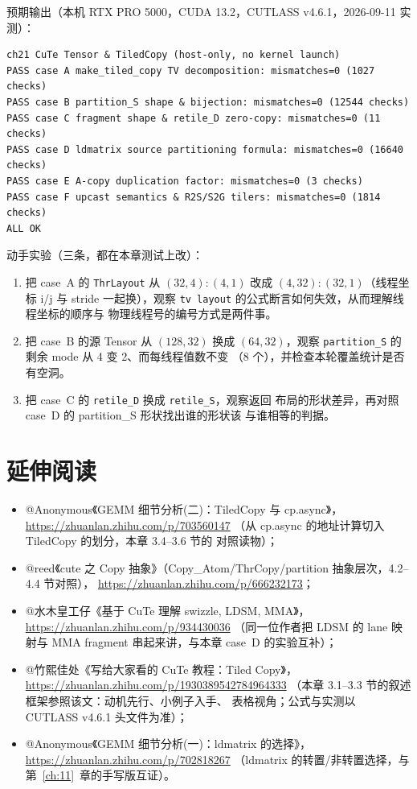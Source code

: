 预期输出（本机 RTX PRO 5000，CUDA 13.2，CUTLASS v4.6.1，2026-09-11 实测）：

\begin{lstlisting}[style=console]
ch21 CuTe Tensor & TiledCopy (host-only, no kernel launch)
PASS case A make_tiled_copy TV decomposition: mismatches=0 (1027 checks)
PASS case B partition_S shape & bijection: mismatches=0 (12544 checks)
PASS case C fragment shape & retile_D zero-copy: mismatches=0 (11 checks)
PASS case D ldmatrix source partitioning formula: mismatches=0 (16640 checks)
PASS case E A-copy duplication factor: mismatches=0 (3 checks)
PASS case F upcast semantics & R2S/S2G tilers: mismatches=0 (1814 checks)
ALL OK
\end{lstlisting}

动手实验（三条，都在本章测试上改）：

\begin{enumerate}
  \item 把 case~A 的 \texttt{ThrLayout} 从 $(32,4){:}(4,1)$ 改成
        $(4,32){:}(32,1)$（线程坐标 i/j 与 stride 一起换），观察
        \texttt{tv layout} 的公式断言如何失效，从而理解线程坐标的顺序与
        物理线程号的编号方式是两件事。
  \item 把 case~B 的源 Tensor 从 $(128,32)$ 换成 $(64,32)$，观察
        \texttt{partition\_S} 的剩余 mode 从 4 变 2、而每线程值数不变
        （8 个），并检查本轮覆盖统计是否有空洞。
  \item 把 case~C 的 \texttt{retile\_D} 换成 \texttt{retile\_S}，观察返回
        布局的形状差异，再对照 case~D 的 partition\_S 形状找出谁的形状该
        与谁相等的判据。
\end{enumerate}

\section*{延伸阅读}

\begin{itemize}
  \item @Anonymous《GEMM 细节分析(二)：TiledCopy 与 cp.async》，
        \url{https://zhuanlan.zhihu.com/p/703560147}
        （从 cp.async 的地址计算切入 TiledCopy 的划分，本章 3.4--3.6 节的
        对照读物）；
  \item @reed《cute 之 Copy 抽象》（Copy\_Atom/ThrCopy/partition
        抽象层次，4.2--4.4 节对照），
        \url{https://zhuanlan.zhihu.com/p/666232173}；
  \item @水木皇工仔《基于 CuTe 理解 swizzle, LDSM, MMA》，
        \url{https://zhuanlan.zhihu.com/p/934430036}
        （同一位作者把 LDSM 的 lane 映射与 MMA fragment 串起来讲，与本章
        case~D 的实验互补）；
  \item @竹熙佳处《写给大家看的 CuTe 教程：Tiled Copy》，
        \url{https://zhuanlan.zhihu.com/p/1930389542784964333}
        （本章 3.1--3.3 节的叙述框架参照该文：动机先行、小例子入手、
        表格视角；公式与实测以 CUTLASS v4.6.1 头文件为准）；
  \item @Anonymous《GEMM 细节分析(一)：ldmatrix 的选择》，
        \url{https://zhuanlan.zhihu.com/p/702818267}
        （ldmatrix 的转置/非转置选择，与第~\ref{ch:11}~章的手写版互证）。
\end{itemize}

